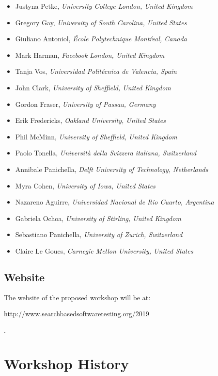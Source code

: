 \documentclass[10pt,conference]{IEEEtran}
\begin{document}
{\small
\begin{itemize}[leftmargin=*]\setlength{\itemsep}{0cm}
\item Justyna Petke, {\it University College London, United Kingdom}
\item Gregory Gay, {\it University of South Carolina, United States}
\item Giuliano Antoniol, {\it \'Ecole Polytechnique Mont\'real, Canada}
\item Mark Harman, {\it Facebook London, United Kingdom}
\item Tanja Vos, {\it Universidad Polit\'ecnica de Valencia, Spain}
\item John Clark, {\it University of Sheffield, United Kingdom}
\item Gordon Fraser, {\it University of Passau, Germany}
\item Erik Fredericks, {\it Oakland University, United States}
\item Phil McMinn, {\it University of Sheffield, United Kingdom}
\item Paolo Tonella, {\it Universit\`a della Svizzera italiana, Switzerland}
\item Annibale Panichella, {\it Delft University of Technology, Netherlands}
\item Myra Cohen, {\it University of Iowa, United States}
\item Nazareno Aguirre, {\it Universidad Nacional de Rio Cuarto, Argentina}
\item Gabriela Ochoa, {\it University of Stirling, United Kingdom}
\item Sebastiano Panichella, {\it University of Zurich, Switzerland}
\item Claire Le Goues, {\it Carnegie Mellon University, United States}
\end{itemize}
}
 
\subsection{Website}

The website of the proposed workshop will be at:\\\centerline{\url{http://www.searchbasedsoftwaretesting.org/2019}}.

\section{Workshop History}
\end{document}
